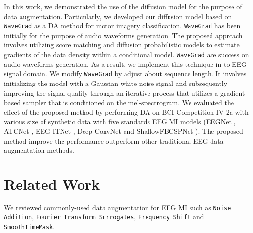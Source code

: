 \documentclass[12pt]{iopart}
\begin{document}

In this work,  we demonstrated the use of the diffusion model for the purpose of data augmentation.  Particularly, we developed our diffusion model based on \texttt{WaveGrad} \cite{chen2020wavegrad} as a DA method for motor imagery classification.  \texttt{WaveGrad} has been initially for the purpose of audio waveforms generation.  The proposed approach involves utilizing score matching \cite{song2020sliced} and diffusion probabilistic models to estimate gradients of the data density within a conditional model. \texttt{WaveGrad} are success on audio waveforms generation. As a result, we implement this technique in to EEG signal domain. We modify \texttt{WaveGrad} by adjust about sequence length.   It involves initializing the model with a Gaussian white noise signal and subsequently improving the signal quality through an iterative process that utilizes a gradient-based sampler that is conditioned on the mel-spectrogram. We evaluated the effect of the proposed method by performing DA on BCI Competition IV 2a \cite{brunner2008bci} with various size of synthetic data with five standards EEG MI models (EEGNet \cite{lawhern2018eegnet}, ATCNet \cite{altaheri2022physics}, EEG-ITNet \cite{salami2022eeg}, Deep ConvNet \cite{schirrmeister2017deep} and ShallowFBCSPNet \cite{schirrmeister2017deep}). The proposed method improve the performance outperform other traditional EEG data augmentation methods. 

\section{Related Work}

\begin{sloppypar}    
We reviewed commonly-used data augmentation for EEG MI such as \texttt{Noise Addition}, \texttt{Fourier Transform Surrogates}, \texttt{Frequency Shift} and \texttt{SmoothTimeMask}.
\end{sloppypar}
\end{document}
